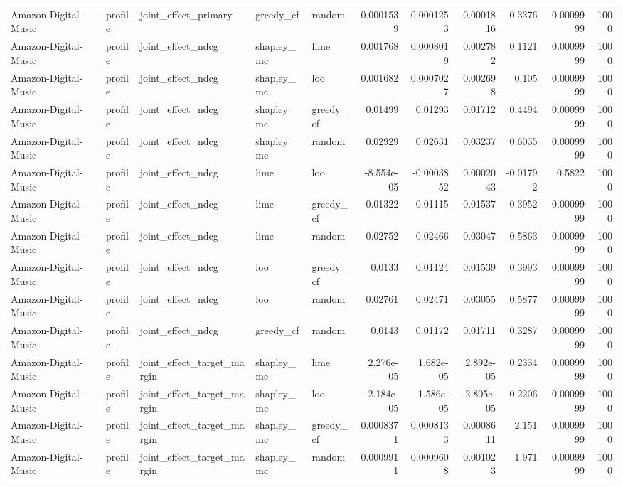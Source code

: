 \begin{table}[t]
\begin{tabular}{lllllrrrrrr}
Amazon-Digital-Music & profile & joint\_effect\_primary & greedy\_cf & random & 0.0001539 & 0.0001253 & 0.0001816 & 0.3376 & 0.0009999 & 1000 \\
Amazon-Digital-Music & profile & joint\_effect\_ndcg & shapley\_mc & lime & 0.001768 & 0.0008019 & 0.002782 & 0.1121 & 0.0009999 & 1000 \\
Amazon-Digital-Music & profile & joint\_effect\_ndcg & shapley\_mc & loo & 0.001682 & 0.0007027 & 0.002698 & 0.105 & 0.0009999 & 1000 \\
Amazon-Digital-Music & profile & joint\_effect\_ndcg & shapley\_mc & greedy\_cf & 0.01499 & 0.01293 & 0.01712 & 0.4494 & 0.0009999 & 1000 \\
Amazon-Digital-Music & profile & joint\_effect\_ndcg & shapley\_mc & random & 0.02929 & 0.02631 & 0.03237 & 0.6035 & 0.0009999 & 1000 \\
Amazon-Digital-Music & profile & joint\_effect\_ndcg & lime & loo & -8.554e-05 & -0.0003852 & 0.0002043 & -0.01792 & 0.5822 & 1000 \\
Amazon-Digital-Music & profile & joint\_effect\_ndcg & lime & greedy\_cf & 0.01322 & 0.01115 & 0.01537 & 0.3952 & 0.0009999 & 1000 \\
Amazon-Digital-Music & profile & joint\_effect\_ndcg & lime & random & 0.02752 & 0.02466 & 0.03047 & 0.5863 & 0.0009999 & 1000 \\
Amazon-Digital-Music & profile & joint\_effect\_ndcg & loo & greedy\_cf & 0.0133 & 0.01124 & 0.01539 & 0.3993 & 0.0009999 & 1000 \\
Amazon-Digital-Music & profile & joint\_effect\_ndcg & loo & random & 0.02761 & 0.02471 & 0.03055 & 0.5877 & 0.0009999 & 1000 \\
Amazon-Digital-Music & profile & joint\_effect\_ndcg & greedy\_cf & random & 0.0143 & 0.01172 & 0.01711 & 0.3287 & 0.0009999 & 1000 \\
Amazon-Digital-Music & profile & joint\_effect\_target\_margin & shapley\_mc & lime & 2.276e-05 & 1.682e-05 & 2.892e-05 & 0.2334 & 0.0009999 & 1000 \\
Amazon-Digital-Music & profile & joint\_effect\_target\_margin & shapley\_mc & loo & 2.184e-05 & 1.586e-05 & 2.805e-05 & 0.2206 & 0.0009999 & 1000 \\
Amazon-Digital-Music & profile & joint\_effect\_target\_margin & shapley\_mc & greedy\_cf & 0.0008371 & 0.0008133 & 0.0008611 & 2.151 & 0.0009999 & 1000 \\
Amazon-Digital-Music & profile & joint\_effect\_target\_margin & shapley\_mc & random & 0.0009911 & 0.0009608 & 0.001023 & 1.971 & 0.0009999 & 1000 \\

\end{tabular}
\end{table}
